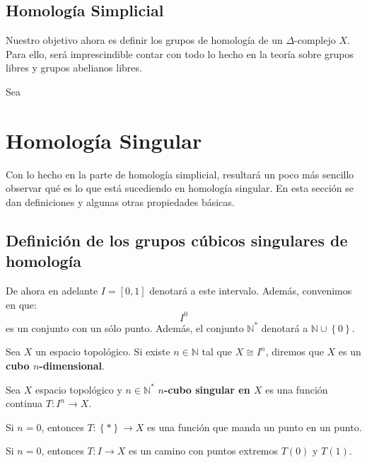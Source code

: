 \documentclass[12pt]{report}
\theoremstyle{largebreak}
\newcommand\cf[3]{\ensuremath{#1:#2\rightarrow#3}}
\begin{document}
    \subsection{Homología Simplicial}

    Nuestro objetivo ahora es definir los grupos de homología de un $\Delta$-complejo $X$. Para ello, será imprescindible contar con todo lo hecho en la teoría sobre grupos libres y grupos abelianos libres.

    \begin{mydef}
        Sea 
    \end{mydef}

    \section{Homología Singular}

    Con lo hecho en la parte de homología simplicial, resultará un poco más sencillo observar qué es lo que está sucediendo en homología singular. En esta sección se dan definiciones y algunas otras propiedades básicas.

    \subsection{Definición de los grupos cúbicos singulares de homología}

    \begin{obs}
        De ahora en adelante $I=[0,1]$ denotará a este intervalo. Además, convenimos en que:
        \begin{equation*}
            I^0
        \end{equation*}
        es un conjunto con un sólo punto. Además, el conjunto $\mathbb{N}^*$ denotará a $\mathbb{N}\cup\left\{0\right\}.$
    \end{obs}

    \begin{mydef}
        Sea $X$ un espacio topológico. Si existe $n\in\mathbb{N}$ tal que $X\cong I^n$, diremos que $X$ es un \textbf{cubo $n$-dimensional}.
    \end{mydef}

    \begin{mydef}
        Sea $X$ espacio topológico y $n\in\mathbb{N}^*$ \textbf{$n$-cubo singular en $X$} es una función continua $\cf{T}{I^n}{X}$. 
    \end{mydef}

    \begin{exa}
        Si $n=0$, entonces $\cf{T}{\left\{* \right\}}{X}$ es una función que manda un punto en un punto.

        Si $n=0$, entonces $\cf{T}{I}{X}$ es un camino con puntos extremos $T(0)$ y $T(1)$.
    \end{exa}
\end{document}
